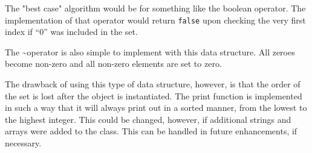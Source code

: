 \documentclass[12pt, letterpaper]{article}
\begin{document}
The "best case" algorithm would be for something like the boolean operator. The implementation of that operator would return \texttt{false} upon checking the very first index if ``0'' was included in the set. 

The \textasciitilde operator is also simple to implement with this data structure. All zeroes become non-zero and all non-zero elements are set to zero.

The drawback of using this type of data structure, however, is that the order of the set is lost after the object is instantiated. The print function is implemented in such a way that it will always print out in a sorted manner, from the lowest to the highest integer. This could be changed, however, if additional strings and arrays were added to the class. This can be handled in future enhancements, if necessary.
\end{document}
